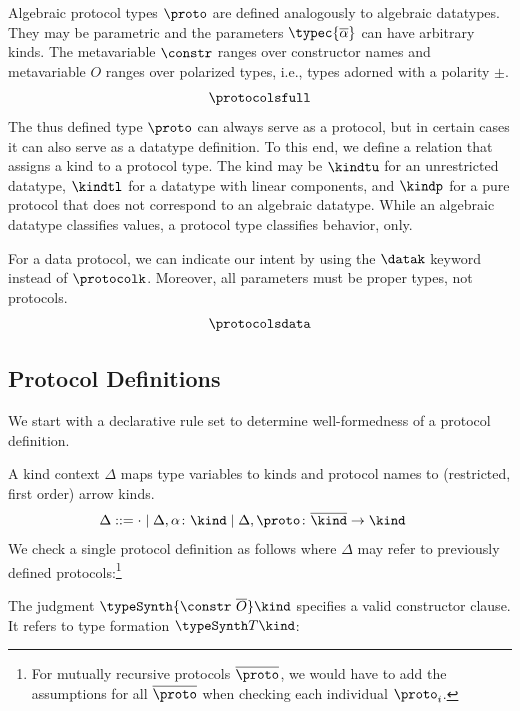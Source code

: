 Algebraic protocol types $\proto$ are defined analogously to algebraic
datatypes. They may be parametric and the parameters $\typec{\overline\alpha}$ can have
arbitrary kinds. The metavariable $\constr$ ranges over constructor names
and metavariable $O$ ranges over polarized types, 
i.e., types adorned with a polarity $\pm$.
\begin{gather*}
  \protocolsfull
\end{gather*}
The thus defined type $\proto$ can always serve as a protocol, but in
certain cases it can also serve as a datatype definition. To this end,
we define a relation that assigns a kind to a protocol type. The kind
may be $\kindtu$ for an unrestricted datatype, $\kindtl$ for a
datatype with linear components, and $\kindp$ for a pure protocol that
does not correspond to an algebraic datatype. While an algebraic
datatype classifies values, a protocol type classifies behavior, only. 

For a data protocol, we can indicate our intent by using the $\datak$
keyword instead of $\protocolk$. Moreover, all parameters must be
proper types, not protocols.
\begin{gather*}
  \protocolsdata
\end{gather*}

\clearpage
\subsection{Protocol Definitions}
\label{sec:decl-spec-prot}


We start with a declarative rule set to determine well-formedness of a
protocol definition.

A kind context $\Delta$ maps type variables to kinds and protocol
names to (restricted, first order) arrow kinds.
\begin{align*}
  \Delta & ::=  \cdot
           \mid \Delta, \alpha\colon\kind
           \mid \Delta,  \proto\colon \overline\kind \to \kind
\end{align*}
We check a single protocol definition as follows where $\Delta$ may
refer to previously defined protocols:\footnote{For mutually
  recursive protocols $\overline\proto$, we would have to add the
  assumptions for all $\overline\proto$ when checking each individual $\proto_i$.}
\begin{mathpar}
\end{mathpar}
The judgment $ \typeSynth{{\constr\ \overline{O}}} \kind$ specifies a
valid constructor clause. It refers to type formation $\typeSynth T \kind$:
\begin{mathpar}
\end{mathpar}

